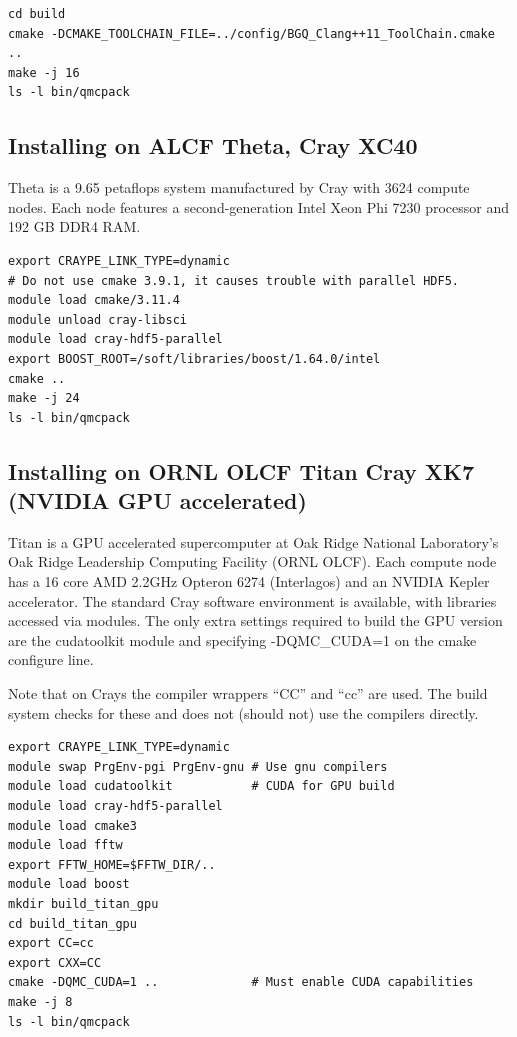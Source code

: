 \verbatimfont{\footnotesize}%
\begin{verbatim}
cd build
cmake -DCMAKE_TOOLCHAIN_FILE=../config/BGQ_Clang++11_ToolChain.cmake ..
make -j 16
ls -l bin/qmcpack
\end{verbatim}

\subsection{Installing on ALCF Theta, Cray XC40}
Theta is a 9.65 petaflops system manufactured by Cray with 3624 compute nodes.
Each node features a second-generation Intel Xeon Phi 7230 processor and 192 GB DDR4 RAM.

\verbatimfont{\footnotesize}%
\begin{verbatim}
export CRAYPE_LINK_TYPE=dynamic
# Do not use cmake 3.9.1, it causes trouble with parallel HDF5.
module load cmake/3.11.4
module unload cray-libsci
module load cray-hdf5-parallel
export BOOST_ROOT=/soft/libraries/boost/1.64.0/intel
cmake ..
make -j 24
ls -l bin/qmcpack
\end{verbatim}

\subsection{Installing on ORNL OLCF Titan Cray XK7 (NVIDIA GPU
  accelerated)}
\label{sec:titanbuildgpu}
Titan is a GPU accelerated supercomputer at Oak Ridge National
Laboratory's  Oak Ridge Leadership Computing Facility  (ORNL OLCF). Each
compute node has a 16 core AMD 2.2GHz Opteron 6274 (Interlagos) and an
NVIDIA Kepler accelerator. The standard Cray software environment is
available, with libraries accessed via modules. The only extra
settings required to build the GPU version are the cudatoolkit module
and specifying -DQMC\_CUDA=1 on the cmake configure line.

Note that on Crays the compiler wrappers ``CC'' and ``cc'' are
used. The build system checks for these and does not (should not) use
the compilers directly.

\verbatimfont{\footnotesize}%
\begin{verbatim}
export CRAYPE_LINK_TYPE=dynamic
module swap PrgEnv-pgi PrgEnv-gnu # Use gnu compilers
module load cudatoolkit           # CUDA for GPU build
module load cray-hdf5-parallel
module load cmake3
module load fftw
export FFTW_HOME=$FFTW_DIR/..
module load boost
mkdir build_titan_gpu
cd build_titan_gpu
export CC=cc
export CXX=CC
cmake -DQMC_CUDA=1 ..             # Must enable CUDA capabilities
make -j 8
ls -l bin/qmcpack
\end{verbatim}

